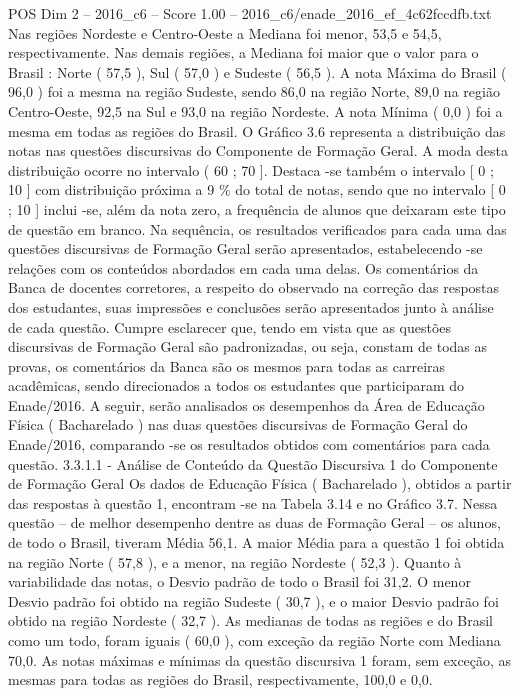 \begin{textsample}{POS Dim 2 – 2016\_c6 – Score 1.00 – 2016\_c6/enade\_2016\_ef\_4c62fccdfb.txt}
Nas regiões Nordeste e Centro-Oeste a Mediana foi menor, 53,5 e 54,5, respectivamente.
Nas demais regiões, a Mediana foi maior que o valor para o Brasil : Norte ( 57,5 ), Sul ( 57,0 ) e Sudeste ( 56,5 ).
A nota Máxima do Brasil ( 96,0 ) foi a mesma na região Sudeste, sendo 86,0 na região Norte, 89,0 na região Centro-Oeste, 92,5 na Sul e 93,0 na região Nordeste.
A nota Mínima ( 0,0 ) foi a mesma em todas as regiões do Brasil.
O Gráfico 3.6 representa a distribuição das notas nas questões discursivas do Componente de Formação Geral.
A moda desta distribuição ocorre no intervalo ( 60 ; 70 ].
Destaca -se também o intervalo [ 0 ; 10 ] com distribuição próxima a 9 \% do total de notas, sendo que no intervalo [ 0 ; 10 ] inclui -se, além da nota zero, a frequência de alunos que deixaram este tipo de questão em branco.
Na sequência, os resultados verificados para cada uma das questões discursivas de Formação Geral serão apresentados, estabelecendo -se relações com os conteúdos abordados em cada uma delas.
Os comentários da Banca de docentes corretores, a respeito do observado na correção das respostas dos estudantes, suas impressões e conclusões serão apresentados junto à análise de cada questão.
Cumpre esclarecer que, tendo em vista que as questões discursivas de Formação Geral são padronizadas, ou seja, constam de todas as provas, os comentários da Banca são os mesmos para todas as carreiras acadêmicas, sendo direcionados a todos os estudantes que participaram do Enade/2016.
A seguir, serão analisados os desempenhos da Área de Educação Física ( Bacharelado ) nas duas questões discursivas de Formação Geral do Enade/2016, comparando -se os resultados obtidos com comentários para cada questão. 3.3.1.1 - Análise de Conteúdo da Questão Discursiva 1 do Componente de Formação Geral Os dados de Educação Física ( Bacharelado ), obtidos a partir das respostas à questão 1, encontram -se na Tabela 3.14 e no Gráfico 3.7.
Nessa questão – de melhor desempenho dentre as duas de Formação Geral – os alunos, de todo o Brasil, tiveram Média 56,1.
A maior Média para a questão 1 foi obtida na região Norte ( 57,8 ), e a menor, na região Nordeste ( 52,3 ).
Quanto à variabilidade das notas, o Desvio padrão de todo o Brasil foi 31,2.
O menor Desvio padrão foi obtido na região Sudeste ( 30,7 ), e o maior Desvio padrão foi obtido na região Nordeste ( 32,7 ).
As medianas de todas as regiões e do Brasil como um todo, foram iguais ( 60,0 ), com exceção da região Norte com Mediana 70,0.
As notas máximas e mínimas da questão discursiva 1 foram, sem exceção, as mesmas para todas as regiões do Brasil, respectivamente, 100,0 e 0,0.

\end{textsample}
